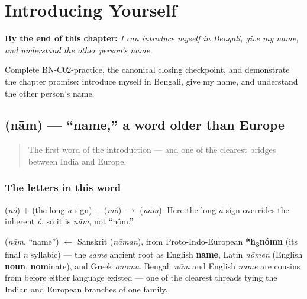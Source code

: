 
\chapter{Introducing Yourself}
\label{ch:introductions}

\begin{chapteropening}
\textbf{By the end of this chapter:} \emph{I can introduce myself in Bengali, give my name, and understand the other person's name.}

Complete BN-C02-practice, the canonical closing checkpoint, and demonstrate the chapter promise: introduce myself in Bengali, give my name, and understand the other person's name.
\end{chapteropening}

\section[\bn{নাম}]{ (nām) — \textquotedblleft{}name,\textquotedblright{} a word older than Europe}

\label{lesson:BN-C02-naam}



\begin{quote}
The first word of the introduction — and one of the clearest bridges between India and Europe.
\end{quote}

\subsection*{The letters in this word}
\textbf{} (\emph{nô}) + \textbf{} (the long-\emph{ā} sign) + \textbf{} (\emph{mô}) $\to$ \textbf{} (\emph{nām}). Here the long-\emph{ā} sign overrides the inherent \emph{ô}, so it is \emph{nām}, not \textquotedblleft{}nôm.\textquotedblright{}

\begin{cousinweb}
\textbf{} (\emph{nām}, \textquotedblleft{}name\textquotedblright{}) $\leftarrow$ Sanskrit \textbf{} (\emph{nāman}), from Proto-Indo-European \textbf{*h\textsubscript{3}nómn} (its final \emph{n} syllabic) — the \emph{same} ancient root as English \textbf{name}, Latin \emph{nōmen} (English \textbf{noun}, \textbf{nom}inate), and Greek \emph{onoma}. Bengali \emph{nām} and English \emph{name} are cousins from before either language existed — one of the clearest threads tying the Indian and European branches of one family.
\end{cousinweb}

